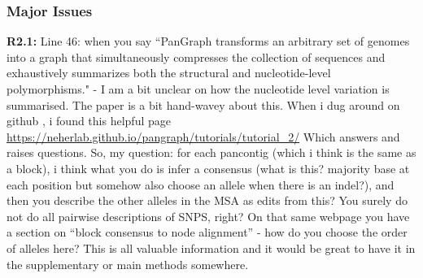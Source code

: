 \documentclass[aps,rmp,onecolumn]{revtex4-1}
\newcommand{\Marco}[1]{{\color{orange}Marco: #1}}
\newcommand{\Liam}[1]{{\color{teal}Liam: #1}}
\newcommand{\reviewer}[2]{\textbf{#1:} #2\vskip 5mm}
\begin{document}
\subsubsection*{Major Issues}

\reviewer{R2.1}{Line 46: when you say ``PanGraph transforms an arbitrary set of genomes into a graph that simultaneously compresses the collection of sequences and exhaustively summarizes both the structural and nucleotide-level polymorphisms." - I am a bit unclear on how the nucleotide level variation is summarised. The paper is a bit hand-wavey about this. When i dug around on github , i found this helpful page \url{https://neherlab.github.io/pangraph/tutorials/tutorial_2/} Which answers and raises questions. So, my question: for each pancontig (which i think is the same as a block), i think what you do is infer a consensus (what is this? majority base at each position but somehow also choose an allele when there is an indel?), and then you describe the other alleles in the MSA as edits from this? You surely do not do all pairwise descriptions of SNPS, right? On that same webpage you have a section on ``block consensus to node alignment'' - how do you choose the order of alleles here? This is all valuable information and it would be great to have it in the supplementary or main methods somewhere.}
\end{document}

